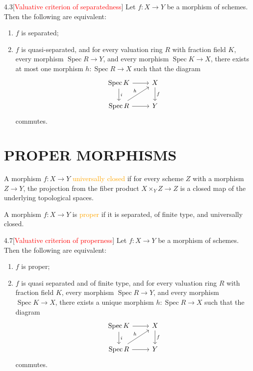 \begin{theorem}{4.3}[\textcolor{red}{Valuative criterion of separatedness}]
	Let $f:X\rightarrow Y$ be a morphism of schemes. Then the following are equivalent:
	\begin{enumerate}[label=\textup{(\roman*)}]
		\item $f$ is separated;
		\item $f$ is quasi-separated, and for every valuation ring $R$ with fraction field $K$, every morphism $\operatorname{Spec}R\rightarrow Y$, and every morphism $\operatorname{Spec}K\rightarrow X$, there exists at most one morphism $h:\operatorname{Spec}R\rightarrow X$ such that the diagram
		\begin{equation*}
			\begin{tikzcd}
				\operatorname{Spec}K\arrow[r]\arrow[d,"i"]&X\arrow[d,"f"]\\
				\operatorname{Spec}R\arrow[ur,"h"]\arrow[r]&Y
			\end{tikzcd}
		\end{equation*}
		commutes.
	\end{enumerate}
\end{theorem}

\section*{PROPER MORPHISMS}

\begin{definition}
	A morphism $f:X\rightarrow Y$ \textcolor{orange}{universally closed} if for every scheme $Z$ with a morphism $Z\rightarrow Y$, the projection from the fiber product $X\times_YZ\rightarrow Z$ is a closed map of the underlying topological spaces.
\end{definition}

\begin{definition}
	A morphism $f:X\rightarrow Y$ is \textcolor{orange}{proper} if it is separated, of finite type, and universally closed.
\end{definition}

\begin{theorem}{4.7}[\textcolor{red}{Valuative criterion of properness}]
	Let $f:X\rightarrow Y$ be a morphism of schemes. Then the following are equivalent:
	\begin{enumerate}[label=\textup{(\roman*)}]
		\item $f$ is proper;
		\item $f$ is quasi separated and of finite type, and for every valuation ring $R$ with fraction field $K$, every morphism $\operatorname{Spec}R\rightarrow Y$, and every morphism $\operatorname{Spec}K\rightarrow X$, there exists a unique morphism $h:\operatorname{Spec}R\rightarrow X$ such that the diagram
		\begin{equation*}
			\begin{tikzcd}
				\operatorname{Spec}K\arrow[r]\arrow[d,"i"]&X\arrow[d,"f"]\\
				\operatorname{Spec}R\arrow[ur,"h"]\arrow[r]&Y
			\end{tikzcd}
		\end{equation*}
		commutes.
	\end{enumerate}
\end{theorem}

